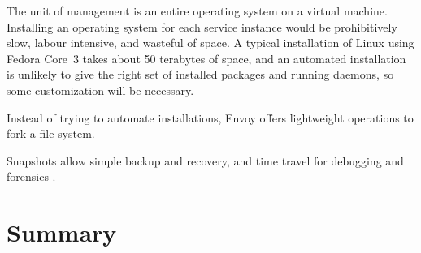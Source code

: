 The unit of management is an entire operating system on a virtual machine. Installing an operating system for each service instance would be prohibitively slow, labour intensive, and wasteful of space. A typical installation of Linux using Fedora Core~3 takes about 50 terabytes of space, and an automated installation is unlikely to give the right set of installed packages and running daemons, so some customization will be necessary.

Instead of trying to automate installations, Envoy offers lightweight operations to fork a file system.

Snapshots allow simple backup and recovery, and time travel for debugging and forensics \cite{whitaker}.

\section{Summary}
